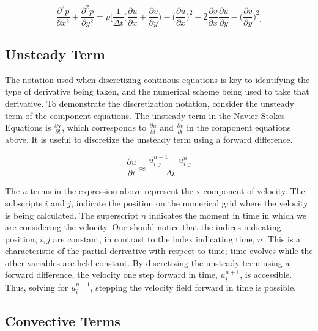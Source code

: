 \begin{equation}
\frac{\partial^2p}{\partial{x}^2} + \frac{\partial^2p}{\partial{y}^2} = \rho \bigg[ \frac{1}{\Delta{t}}\bigg(\frac{\partial{u}}{\partial{x}} + \frac{\partial{v}}{\partial{y}} \bigg) - \bigg(\frac{\partial{u}}{\partial{x}} \bigg)^2 - 2\frac{\partial{v}}{\partial{x}}\frac{\partial{u}}{\partial{y}} - \bigg(\frac{\partial{v}}{\partial{y}}  \bigg)^2  \bigg]
\label{eq:exs2}
\end{equation}

\subsection{Unsteady Term}

The notation used when discretizing continous equations is key to identifying the type of derivative being taken, and the numerical scheme being used to take that derivative.
To demonstrate the discretization notation, consider the unsteady term of the component equations.
The unsteady term in the Navier-Stokes Equations is $\frac{\partial{\mathbf{v}}}{\partial{t}}$, which corresponds to $\frac{\partial{u}}{\partial{t}}$ and $\frac{\partial{v}}{\partial{t}}$ in the component equations above.
It is useful to discretize the unsteady term using a forward difference.

\begin{equation}
\frac{\partial{u}}{\partial{t}} \approx \frac{u_{i,j}^{n+1} - u_{i,j}^{n}}{\Delta{t}}
\end{equation}

The $u$ terms in the expression above represent the x-component of velocity.
The subscripts $i$ and $j$, indicate the position on the numerical grid where the velocity is being calculated.
The superscript $n$ indicates the moment in time in which we are considering the velocity.
One should notice that the indices indicating position, $i,j$ are constant, in contrast to the index indicating time, $n$.
This is a characteristic of the partial derivative with respect to time; time evolves while the other variables are held constant.
By discretizing the unsteady term using a forward difference, the velocity one step forward in time, $u_{i}^{n+1}$, is accessible.
Thus, solving for $u_{i}^{n+1}$, stepping the velocity field forward in time is possible.

\subsection{Convective Terms}

